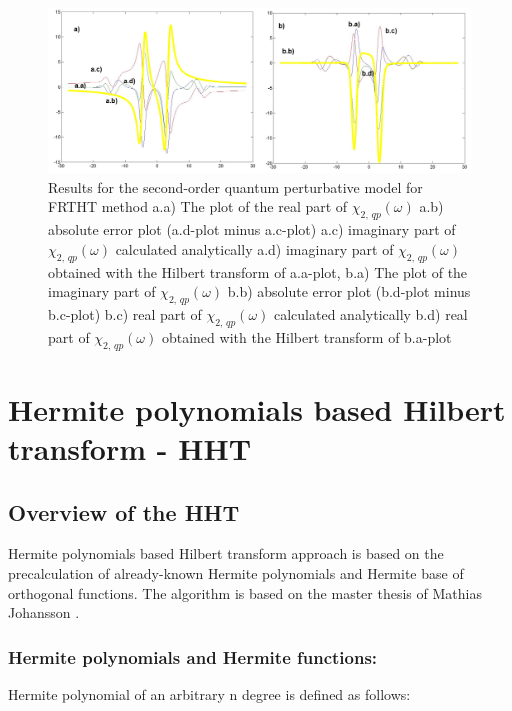 \documentclass[12pt,twoside,a4paper]{article}
\numberwithin{equation}{subsection}
\numberwithin{figure}{subsection}
\begin{document}
\begin{figure} 
  \includegraphics[width=150mm]{img/fht_qp2.png}
  \caption{Results for the second-order quantum perturbative model for FRTHT method
     a.a) The plot of the real part of $\chi_{2, \, qp}(\omega )$
     a.b) absolute error plot (a.d-plot minus a.c-plot) 
     a.c) imaginary part of $\chi_{2, \, qp}(\omega )$ calculated analytically 
     a.d) imaginary part of $\chi_{2, \, qp}(\omega )$ obtained with the Hilbert transform of a.a-plot, 
     b.a) The plot of the imaginary part of $\chi_{2, \, qp}(\omega )$ 
     b.b) absolute error plot (b.d-plot minus b.c-plot) 
     b.c) real part of $\chi_{2, \, qp} (\omega )$ calculated analytically 
     b.d) real part of $\chi_{2, \, qp} (\omega )$ obtained with the Hilbert transform of b.a-plot 
     \label{fig:fht_qp2}
     }
\end{figure}

\section{Hermite polynomials based Hilbert transform - HHT} \label{chap:hermite}

\subsection{Overview of the HHT}  \label{chap:hermite_overview}

Hermite polynomials based Hilbert transform approach is based on the precalculation of already-known Hermite polynomials and Hermite base of orthogonal functions. The algorithm is based on the master thesis of Mathias Johansson \cite{johansson_hilbert}.

\subsubsection*{Hermite polynomials and Hermite functions:}

Hermite polynomial of an arbitrary n degree is defined as follows:
\end{document}
